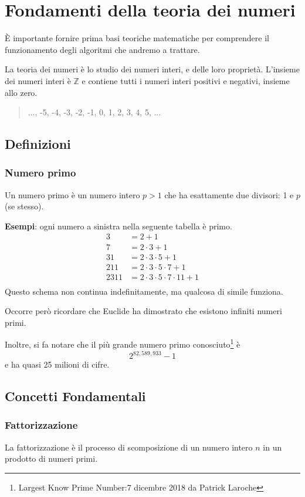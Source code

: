 \documentclass[a4paper,12pt]{report}
\begin{document}
\chapter{Fondamenti della teoria dei numeri}
È importante fornire prima basi teoriche matematiche per comprendere il funzionamento degli algoritmi che andremo a trattare.

La teoria dei numeri è lo studio dei numeri interi, e delle loro proprietà. L'insieme dei numeri interi è $\mathbb{Z}$ e contiene tutti i numeri interi positivi e negativi, insieme allo zero.
\begin{quote}
	\centering
	..., -5, -4, -3, -2, -1,  0,  1,  2,  3,  4,  5, ...
\end{quote}

\section{Definizioni}

\subsection*{Numero primo}
Un numero primo è un numero intero \( p > 1 \) che ha esattamente due divisori: 1 e \(p\) (se stesso).

\textbf{Esempi}: ogni numero a sinistra nella seguente tabella è primo.
\[\begin{array}{ll}
3 & = 2 + 1 \\
7 & = 2 \cdot 3 + 1 \\
31 & = 2 \cdot 3 \cdot 5 + 1 \\
211 & = 2 \cdot 3 \cdot 5 \cdot 7 + 1 \\
2311 & = 2 \cdot 3 \cdot 5 \cdot 7 \cdot 11 + 1 \\
\end{array}\]
Questo schema non continua indefinitamente, ma qualcosa di simile funziona.

Occorre però ricordare che Euclide ha dimostrato che esistono infiniti numeri primi. \cite{stein2008}

Inoltre, si fa notare che il più grande numero primo conosciuto\footnote{Largest Know Prime Number:7 dicembre 2018 da Patrick Laroche} è \[2^{82,589,933} - 1\]
e ha quasi 25 milioni di cifre.

\section{Concetti Fondamentali}
\subsection*{Fattorizzazione}
La fattorizzazione è il processo di scomposizione di un numero intero \( n \) in un prodotto di numeri primi. 
\end{document}
